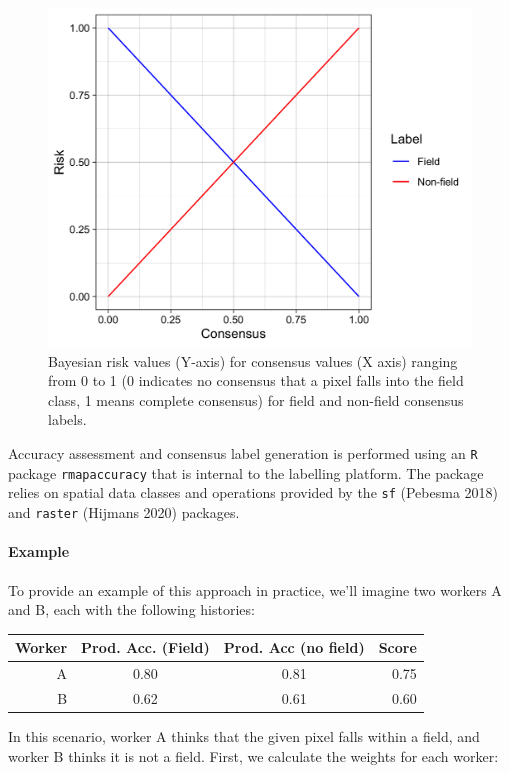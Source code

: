 \documentclass[
  11pt,
  a4paper]{article}
\begin{document}
\begin{figure}[!ht]

{\centering \includegraphics[width=0.7\linewidth,]{figures/si_label_risk} 

}

\caption{Bayesian risk values (Y-axis) for consensus values (X axis) ranging from 0 to 1 (0 indicates no consensus that a pixel falls into the field class, 1 means complete consensus) for field and non-field consensus labels.}\label{fig:riskcurve}
\end{figure}

Accuracy assessment and consensus label generation is performed using an
\texttt{R} package \texttt{rmapaccuracy} that is internal to the
labelling platform. The package relies on spatial data classes and
operations provided by the \texttt{sf} (Pebesma 2018) and
\texttt{raster} (Hijmans 2020) packages.

\hypertarget{example}{%
\paragraph{Example}\label{example}}

To provide an example of this approach in practice, we'll imagine two
workers A and B, each with the following histories:

\begin{longtable}[]{@{}rccr@{}}
\toprule
Worker & Prod. Acc. (Field) & Prod. Acc (no field) & Score \\
\midrule
\endhead
A & 0.80 & 0.81 & 0.75 \\
B & 0.62 & 0.61 & 0.60 \\
\bottomrule
\end{longtable}

In this scenario, worker A thinks that the given pixel falls within a
field, and worker B thinks it is not a field. First, we calculate the
weights for each worker:
\end{document}

